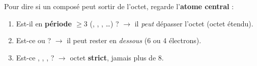 \documentclass[11pt,a4paper]{article}
\begin{document}
\begin{methbox}
Pour dire si un composé peut sortir de l'octet, regarde l'\textbf{atome central} :
\begin{enumerate}[leftmargin=1.7em,topsep=1pt,itemsep=1pt]
  \item Est-il en \textbf{période $\geq 3$} (, , , \ldots) ? $\to$ il
        \emph{peut} dépasser l'octet (octet étendu).
  \item Est-ce  ou  ? $\to$ il peut rester en \emph{dessous} (6 ou 4 électrons).
  \item Est-ce , , ,  ? $\to$ octet \textbf{strict}, jamais plus de 8.
\end{enumerate}
\end{methbox}
\end{document}
